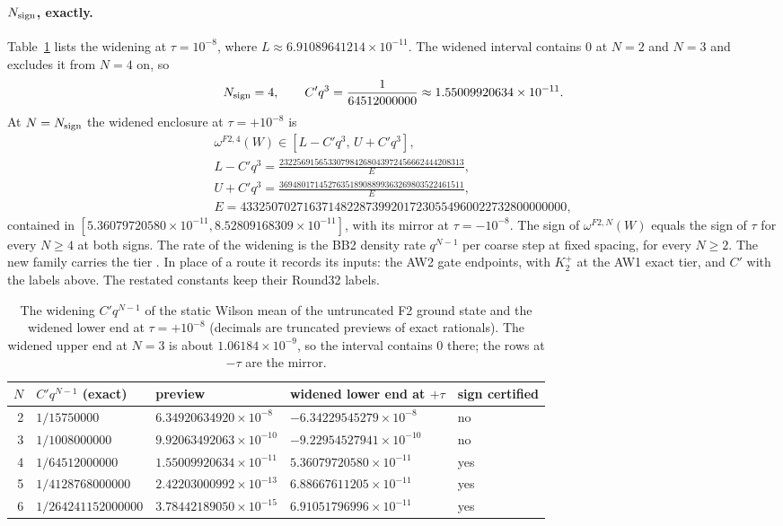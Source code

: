 \paragraph{$N_{\rm sign}$, exactly.} Table~\ref{tab:bc1-nsign} lists the
widening at $\tau=10^{-8}$, where $L\approx6.91089641214\times10^{-11}$. The
widened interval contains 0 at $N=2$ and $N=3$ and excludes it from $N=4$ on,
so
\begin{equation}
 N_{\rm sign}=4,\qquad C'q^{3}=\frac1{64512000000}\approx1.55009920634\times10^{-11}.
 \label{eq:bc1-nsign}
\end{equation}
At $N=N_{\rm sign}$ the widened enclosure at $\tau=+10^{-8}$ is
\begin{equation}
 \begin{gathered}
 \omega^{F2,4}(W)\in[L-C'q^3,\,U+C'q^3],\\
 L-C'q^3=\frac{232256915653307984268043972456662444208313}{E},\\
 U+C'q^3=\frac{369480171452763518908899363269803522461511}{E},\\
 E=4332507027163714822873992017230554960022732800000000,
 \end{gathered}
 \label{eq:bc1-n4}
\end{equation}
contained in $[5.36079720580\times10^{-11},8.52809168309\times10^{-11}]$, with
its mirror at $\tau=-10^{-8}$. The sign of $\omega^{F2,N}(W)$ equals the sign
of $\tau$ for every $N\ge4$ at both signs. The rate of the widening is the
BB2 density rate $q^{N-1}$ per coarse step at fixed spacing, for every
$N\ge2$. The new family carries the tier . In place
of a route it records its inputs: the AW2 gate endpoints, with $K_2^+$ at the
AW1 exact tier, and $C'$ with the labels above. The restated constants keep
their Round32 labels.

\begin{table}[htbp]
\centering\small
\caption{The widening $C'q^{N-1}$ of the static Wilson mean of the
untruncated F2 ground state and the widened lower end at $\tau=+10^{-8}$
(decimals are truncated previews of exact rationals). The widened upper end
at $N=3$ is about $1.06184\times10^{-9}$, so the interval contains 0 there;
the rows at $-\tau$ are the mirror.}
\label{tab:bc1-nsign}
\begin{tabular}{rllll}
\toprule
$N$ & $C'q^{N-1}$ (exact) & preview & widened lower end at $+\tau$ & sign certified\\
\midrule
2 & $1/15750000$ & $6.34920634920\times10^{-8}$ & $-6.34229545279\times10^{-8}$ & no\\
3 & $1/1008000000$ & $9.92063492063\times10^{-10}$ & $-9.22954527941\times10^{-10}$ & no\\
4 & $1/64512000000$ & $1.55009920634\times10^{-11}$ & $5.36079720580\times10^{-11}$ & yes\\
5 & $1/4128768000000$ & $2.42203000992\times10^{-13}$ & $6.88667611205\times10^{-11}$ & yes\\
6 & $1/264241152000000$ & $3.78442189050\times10^{-15}$ & $6.91051796996\times10^{-11}$ & yes\\
\bottomrule
\end{tabular}
\end{table}

